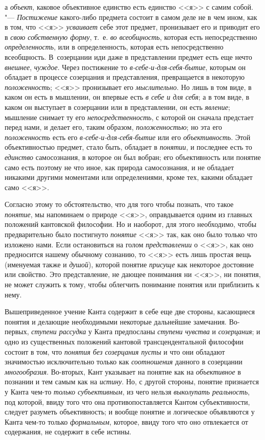 {а {\em объект}, каковое объективное единство есть единство <<я>> с самим собой. "---
{\em Постижение} какого-либо предмета состоит в самом деле не в чем ином, как
в том, что <<я>> {\em усваивает} себе этот предмет, пронизывает его и приводит его
в {\em свою собственную форму}, т.~е. {\em во всеобщность}, которая есть
непосредственно {\em определенность}, или в определенность, которая есть
непосредственно всеобщность. В~созерцании иди даже в представлении предмет
есть еще нечто {\em внешнее}, {\em чуждое}. Через постижение то
{\em в-себе-и-для-себя-бытие}, которым он обладает в процессе созерцания и
представления, превращается в некоторую {\em положенность}; <<я>> пронизывает
его {\em мыслительно}. Но лишь в том виде, в каком он есть в мышлении, он
впервые есть {\em в себе и для себя}; а в том виде, в каком он выступает в
созерцании или в представлении, он есть {\em явление}; мышление снимает ту
его {\em непосредственность}, с которой он сначала предстает перед нами, и
делает его, таким образом, {\em положенностью}; но эта его {\em положенность}
есть его {\em в-себе-и-для-себя-бытие} или его {\em объективность}. Этой
объективностью предмет, стало быть, обладает в {\em понятии}, и последнее
есть то {\em единство} самосознания, в которое он был вобран; его
объективность или понятие само есть поэтому не что иное, как природа
самосознания, и не обладает никакими другими моментами или определениями,
кроме тех, какими обладает само <<я>>.

Согласно этому то обстоятельство, что для того чтобы познать,
что такое {\em понятие},
мы напоминаем о природе <<я>>, оправдывается одним из главных
положений кантовской философии. Но и наоборот, для этого необходимо, чтобы
предварительно было постигнуто
{\em понятие} <<я>> так,
как оно было только что изложено нами. Если остановиться на голом
{\em представлении} о
<<я>>, как оно предносится нашему обычному сознанию, то <<я>> есть лишь простая
вещь (именуемая также и {\em душой}),
которой понятие
{\em присуще} как
некоторое достояние или свойство. Это представление, не дающее понимания ни
<<я>>, ни понятия, не может служить к тому, чтобы облегчить понимание понятия
или приблизить к нему.

Вышеприведенное учение Канта содержит в себе еще две стороны,
касающиеся понятия и делающие необходимыми некоторые дальнейшие замечания.
Во-первых, {\em ступени рассудка}
у Канта предпосланы
{\em ступени чувства} и
{\em созерцания}; и одно
из существенных положений кантовой трансцендентальной философии состоит в
том, что {\em понятия без созерцания
пусты} и что они обладают значимостью исключительно только
как {\em соотношения}
данного в созерцании
{\em многообразия}.
Во-вторых, Кант указывает на понятие как на
{\em объективное} в
познании и тем самым как на
{\em истину}. Но, с
другой стороны, понятие признается у Канта чем-то
{\em только субъективным},
из чего нельзя
{\em выколупать реальность},
под которой, ввиду того что она противопоставляется Кантом
субъективности, следует разуметь объективность; и вообще понятие и
логическое объявляются у Канта чем-то только
{\em формальным},
которое, ввиду того что оно отвлекается от содержания, не
содержит в себе истины.

}
